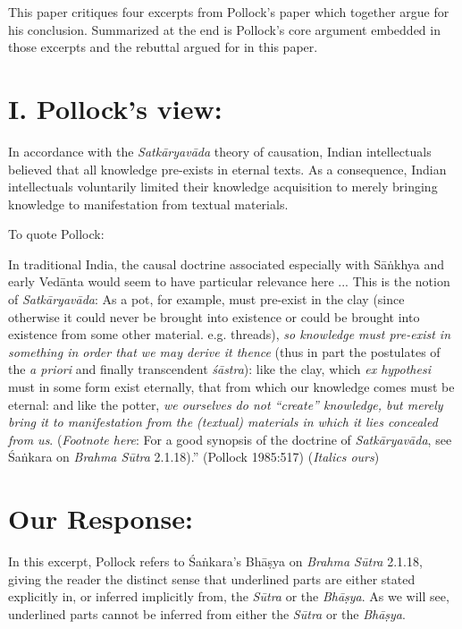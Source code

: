 This paper critiques four excerpts from Pollock's paper which together argue for his conclusion. Summarized at the end is Pollock's core argument embedded in those excerpts and the rebuttal argued for in this paper.

\section*{I. Pollock's view:}  

In accordance with the {\sl Satkāryavāda} theory of causation, Indian intellectuals believed that all knowledge pre-exists in eternal texts. As a consequence, Indian intellectuals voluntarily limited their knowledge acquisition to merely bringing knowledge to manifestation from textual materials.

\newpage

To quote Pollock:
\begin{myquote}
In traditional India, the causal doctrine associated especially with Sāṅkhya and early Vedānta would seem to have particular relevance here ... This is the notion of {\sl Satkāryavāda}: As a pot, for example, must pre-exist in the clay (since otherwise it could never be brought into existence or could be brought into existence from some other material. e.g.  threads), {\sl so knowledge must pre-exist in something in order that we may derive it thence} (thus in part the postulates of the {\sl a priori} and finally transcendent {\sl śāstra}): like the clay, which {\sl ex hypothesi} must in some form exist eternally, that from which our knowledge comes must be eternal: and like the potter, {\sl we ourselves do not ``create'' knowledge, but merely bring it to manifestation from the (textual) materials in which it lies concealed from us}. ({\sl Footnote here}: For a good synopsis of the doctrine of {\sl Satkāryavāda}, see Śaṅkara on {\sl Brahma Sūtra} 2.1.18).''  
\hfill (Pollock 1985:517) ({\sl Italics ours})
\end{myquote}

\section*{Our Response:}

In this excerpt, Pollock refers to Śaṅkara's Bhāṣya on {\sl Brahma Sūtra} 2.1.18, giving the reader the distinct sense that underlined parts are either stated explicitly in, or inferred implicitly from, the {\sl Sūtra} or the {\sl Bhāṣya}.  As we will see, underlined parts cannot be inferred from either the {\sl Sūtra} or the {\sl Bhāṣya}.

